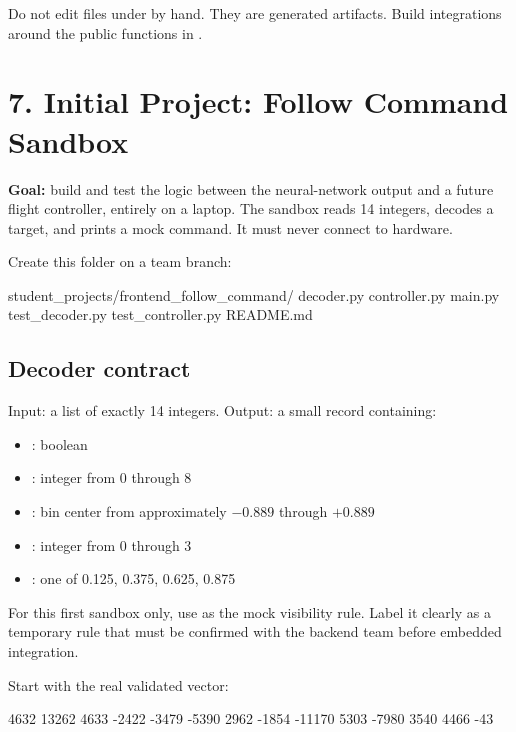 \documentclass[11pt]{article}
\begin{document}
Do not edit files under  by hand. They are generated artifacts. Build integrations around the public functions in .

\newpage
\section{7. Initial Project: Follow Command Sandbox}

\begin{greenbox}
\textbf{Goal:} build and test the logic between the neural-network output and a future flight controller, entirely on a laptop. The sandbox reads 14 integers, decodes a target, and prints a mock command. It must never connect to hardware.
\end{greenbox}

Create this folder on a team branch:

\begin{Code}
student_projects/frontend_follow_command/
  decoder.py
  controller.py
  main.py
  test_decoder.py
  test_controller.py
  README.md
\end{Code}

\subsection{Decoder contract}

Input: a list of exactly 14 integers. Output: a small record containing:

\begin{itemize}
\item {}: boolean
\item {}: integer from 0 through 8
\item {}: bin center from approximately $-0.889$ through $+0.889$
\item {}: integer from 0 through 3
\item {}: one of 0.125, 0.375, 0.625, 0.875
\end{itemize}

For this first sandbox only, use  as the mock visibility rule. Label it clearly as a temporary rule that must be confirmed with the backend team before embedded integration.

Start with the real validated vector:

\begin{Code}
4632 13262 4633 -2422 -3479 -5390 2962
-1854 -11170 5303 -7980 3540 4466 -43
\end{Code}
\end{document}
